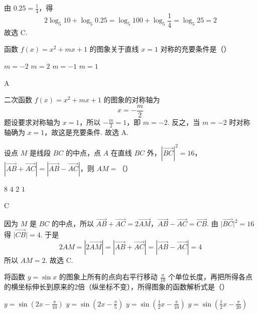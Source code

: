 \begin{solution}
由 \(0.25=\frac14\)，得
\[
2\log_{5}10+\log_{5}0.25
=\log_{5}100+\log_{5}\frac14
=\log_{5}25=2
\]
故选 C.
\end{solution}

\begin{problem}
函数 \( f(x) = x^2 + mx + 1 \) 的图象关于直线 \( x = 1 \) 对称的充要条件是（\quad）

\choices
    {\(m = -2\)}
    {\(m = 2\)}
    {\(m = -1\)}
    {\(m = 1\)}
\end{problem}

\begin{answer}
A
\end{answer}

\begin{solution}
二次函数 \(f(x)=x^2+mx+1\) 的图象的对称轴为
\[
x=-\frac{m}{2}
\]
题设要求对称轴为 \(x=1\)，所以 \(-\frac{m}{2}=1\)，即 \(m=-2\). 反之，当 \(m=-2\) 时对称轴确为 \(x=1\)，故这是充要条件.
故选 A.
\end{solution}

\begin{problem}
设点 \(M\) 是线段 \(BC\) 的中点，点 \(A\) 在直线 \(BC\) 外，\(\left|\overrightarrow{BC}\right|^{2} = 16\)，\(\left|\overrightarrow{AB} + \overrightarrow{AC}\right| = \left|\overrightarrow{AB} - \overrightarrow{AC}\right|\)，则 \(AM =\)（\quad）

\choices
    {\(8\)}
    {\(4\)}
    {\(2\)}
    {\(1\)}
\end{problem}

\begin{answer}
C
\end{answer}

\begin{solution}
因为 \(M\) 是 \(BC\) 的中点，所以
\(\overrightarrow{AB}+\overrightarrow{AC}=2\overrightarrow{AM}\)，\(\overrightarrow{AB}-\overrightarrow{AC}=\overrightarrow{CB}\).
由 \(\lvert\overrightarrow{BC}\rvert^2=16\) 得 \(\lvert\overrightarrow{CB}\rvert=4\). 于是
\[
2AM=\left\lvert2\overrightarrow{AM}\right\rvert
=\left\lvert\overrightarrow{AB}+\overrightarrow{AC}\right\rvert
=\left\lvert\overrightarrow{AB}-\overrightarrow{AC}\right\rvert=4
\]
所以 \(AM=2\).
故选 C.
\end{solution}

\begin{problem}
将函数 \( y = \sin x \) 的图象上所有的点向右平行移动 \( \frac{\pi}{10} \) 个单位长度，再把所得各点的横坐标伸长到原来的2倍（纵坐标不变），所得图象的函数解析式是（\quad）

\choices
    {\(y = \sin \left(2x - \frac{\pi}{10}\right)\)}
    {\( y = \sin \left(2x - \frac{\pi}{5}\right) \)}
    {\( y = \sin \left(\frac{1}{2} x - \frac{\pi}{10}\right) \)}
    {\( y = \sin \left(\frac{1}{2} x - \frac{\pi}{20}\right) \)}
\end{problem}


